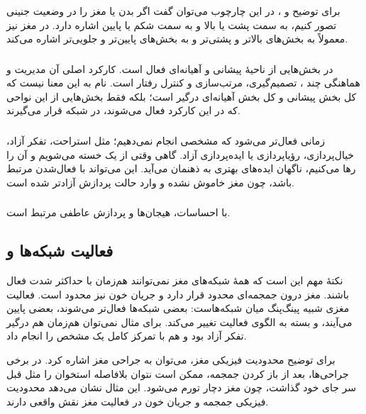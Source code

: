 برای توضیح  و ، در این چارچوب می‌توان گفت اگر بدن یا مغز را در وضعیت جنینی تصور کنیم،  به سمت پشت یا بالا و  به سمت شکم یا پایین اشاره دارد. در مغز نیز  معمولاً به بخش‌های بالاتر و پشتی‌تر و  به بخش‌های پایین‌تر و جلویی‌تر اشاره می‌کند.

\subsubsection{}
 در بخش‌هایی از ناحیهٔ پیشانی و آهیانه‌ای فعال است. کارکرد اصلی آن مدیریت و هماهنگی چند ، تصمیم‌گیری، مرتب‌سازی و کنترل رفتار است. نام  به این معنا نیست که کل بخش پیشانی و کل بخش آهیانه‌ای درگیر است؛ بلکه فقط بخش‌هایی از این نواحی که در این کارکرد فعال می‌شوند، در شبکه قرار می‌گیرند.

\subsubsection{}
 زمانی فعال‌تر می‌شود که  مشخصی انجام نمی‌دهیم؛ مثل استراحت، تفکر آزاد، خیال‌پردازی، رؤیاپردازی یا ایده‌پردازی آزاد. گاهی وقتی از یک  خسته می‌شویم و آن را رها می‌کنیم، ناگهان ایده‌های بهتری به ذهنمان می‌آید. این می‌تواند با فعال‌شدن  مرتبط باشد، چون مغز خاموش نشده و وارد حالت پردازش آزادتر شده است.

\subsubsection{}
 با احساسات، هیجان‌ها و پردازش عاطفی مرتبط است.

\subsection{فعالیت شبکه‌ها و }
نکتهٔ مهم این است که همهٔ شبکه‌های مغز نمی‌توانند هم‌زمان با حداکثر شدت فعال باشند. مغز درون جمجمه‌ای محدود قرار دارد و جریان خون نیز محدود است. فعالیت مغزی شبیه پینگ‌پنگ میان شبکه‌هاست: بعضی شبکه‌ها فعال‌تر می‌شوند، بعضی پایین می‌آیند، و بسته به  الگوی فعالیت تغییر می‌کند. برای مثال نمی‌توان هم‌زمان هم درگیر تفکر آزاد بود و هم با تمرکز کامل یک  مشخص را انجام داد.

برای توضیح محدودیت فیزیکی مغز، می‌توان به جراحی مغز اشاره کرد. در برخی جراحی‌ها، بعد از باز کردن جمجمه، ممکن است نتوان بلافاصله استخوان را مثل قبل سر جای خود گذاشت، چون مغز دچار تورم می‌شود. این مثال نشان می‌دهد محدودیت فیزیکی جمجمه و جریان خون در فعالیت مغز نقش واقعی دارند.

